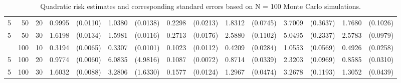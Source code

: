 \begin{table}[ht]
\begin{small}
\begin{tabular}{lrr|rr|rr|rr|rr|rr|rr}
  5 & 50 & 20 & 0.9995 & (0.0110) & 1.0380 & (0.0138) & 0.2298 & (0.0213) & 1.8312 & (0.0745) & 3.7009 & (0.3637) & 1.7680 & (0.1026) \\ 
  5 & 50 & 30 & 1.6198 & (0.0134) & 1.5981 & (0.0116) & 0.2713 & (0.0176) & 2.5880 & (0.1102) & 5.0495 & (0.2337) & 2.5783 & (0.0979) \\ 
\hdashline
  5 & 100 & 10 & 0.3194 & (0.0065) & 0.3307 & (0.0101) & 0.1023 & (0.0112) & 0.4209 & (0.0284) & 1.0553 & (0.0569) & 0.4926 & (0.0258) \\ 
  5 & 100 & 20 & 0.9774 & (0.0060) & 6.0835 & (4.9816) & 0.1087 & (0.0072) & 0.8714 & (0.0339) & 2.3203 & (0.0969) & 0.8585 & (0.0310) \\ 
  5 & 100 & 30 & 1.6032 & (0.0088) & 3.2806 & (1.6330) & 0.1577 & (0.0124) & 1.2967 & (0.0474) & 3.2678 & (0.1193) & 1.3052 & (0.0439) \\ 
   \hline
\end{tabular}
\end{small}
\caption{Quadratic risk estimates and corresponding standard errors based on N = 100 Monte Carlo simulations.} 
\end{table}
